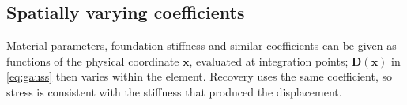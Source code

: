 \subsection{Spatially varying coefficients}
Material parameters, foundation stiffness and similar coefficients can be given as functions of the physical coordinate $\bm x$, evaluated at integration points; $\bm D(\bm x)$ in \eqref{eq:gauss} then varies within the element.
Recovery uses the same coefficient, so stress is consistent with the stiffness that produced the displacement.
